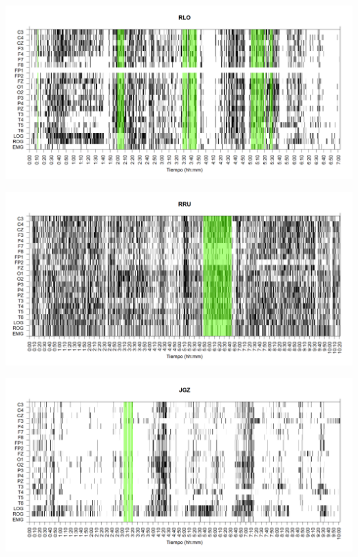 
\begin{SidewaysFigure}
\centering
\includegraphics[width=\linewidth]
{./grafiquitos170404/RLMN10SUE_est.png} 
\caption{Sujeto: RLO | Total \'epocas: 846 | \'Epocas MOR: 99
}
\label{RLO}
\end{SidewaysFigure}


\begin{SidewaysFigure}
\centering
\includegraphics[width=\linewidth]
{./grafiquitos170404/RRMNS_est.png} 
\caption{Sujeto: RRU | Total \'epocas: 1244 | \'Epocas MOR: 114
}
\label{RRU}
\end{SidewaysFigure}


\begin{SidewaysFigure}
\centering
\includegraphics[width=\linewidth]
{./grafiquitos170404/JGMN6SUE_est.png} 
\caption{Sujeto: JGZ | Total \'epocas: 1207 | \'Epocas MOR: 33
}
\label{JGZ}
\end{SidewaysFigure}

